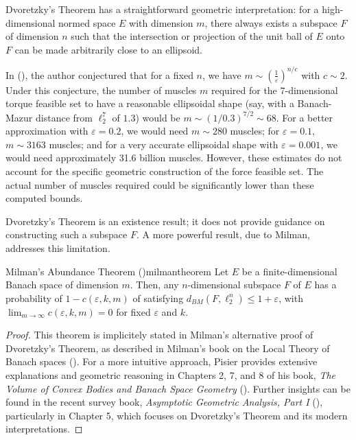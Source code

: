 Dvoretzky's Theorem has a straightforward geometric interpretation: for a high-dimensional normed space $E$ with dimension $m$, there always exists a subspace $F$ of dimension $n$ such that the intersection or projection of the unit ball of $E$ onto $F$ can be made arbitrarily close to an ellipsoid.

In (\cite{milmanDvoretzkyTheoremThirtyYearsLater1992}), the author conjectured that for a fixed $n$, we have $m\sim \left(\frac{1}{\varepsilon}\right)^{n/c}$ with $c\sim 2$. Under this conjecture, the number of muscles $m$ required for the 7-dimensional torque feasible set to have a reasonable ellipsoidal shape (say, with a Banach-Mazur distance from $\ell_2^7$ of $1.3$) would be $m \sim (1/0.3)^{7/2} \sim 68$. For a better approximation with $\varepsilon = 0.2$, we would need $m\sim 280$ muscles; for $\varepsilon = 0.1$,  $m\sim 3163$ muscles; and for a very accurate ellipsoidal shape with $\varepsilon = 0.001$, we would need approximately 31.6 billion muscles.  However, these estimates do not account for the specific geometric construction of the force feasible set. The actual number of muscles required could be significantly lower than these computed bounds.

Dvoretzky's Theorem is an existence result; it does not provide guidance on constructing such a subspace $F$. A more powerful result, due to Milman, addresses this limitation.

\begin{theorembox}{Milman's Abundance Theorem (\cite{milmanAsymptoticTheoryFinite2001})}{milmantheorem}
  Let $E$ be a finite-dimensional Banach space of dimension $m$. Then, any $n$-dimensional subspace $F$ of $E$ has a probability of $1-c(\varepsilon, k, m)$ of satisfying $d_{BM}(F, \ell_2^n) \leq 1 + \varepsilon$, with $\lim_{m\to \infty} c(\varepsilon, k, m) = 0$ for fixed $\varepsilon$ and $k$.
\end{theorembox}
\begin{proof}
  This theorem is implicitely stated in Milman's alternative proof of Dvoretzky's Theorem, as described in Milman's book on the Local Theory of Banach spaces (\cite{milmanAsymptoticTheoryFinite2001}). For a more intuitive approach, Pisier provides extensive explanations and geometric reasoning in Chapters 2, 7, and 8 of his book, \emph{The Volume of Convex Bodies and Banach Space Geometry} (\cite{pisierVolumeConvexBodies1989}).  Further insights can be found in the recent survey book, \emph{Asymptotic Geometric Analysis, Part I} (\cite{artstein-avidanAsymptoticGeometricAnalysis2015}), particularly in Chapter 5, which focuses on Dvoretzky's Theorem and its modern interpretations.
\end{proof}

